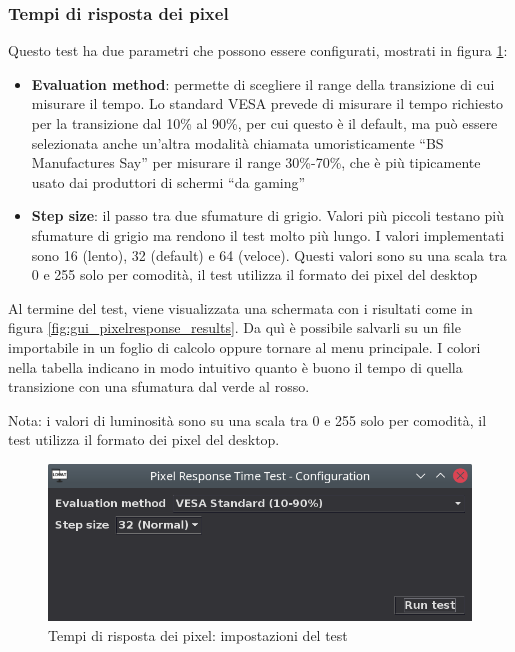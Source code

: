 \subsubsection{Tempi di risposta dei pixel}
Questo test ha due parametri che possono essere configurati, mostrati in figura \ref{fig:gui_pixelresponse_settings}:\begin{itemize}
	\item \textbf{Evaluation method}: permette di scegliere il range della transizione di cui misurare il tempo. Lo standard VESA prevede di misurare il tempo richiesto per la transizione dal 10\% al 90\%, per cui questo è il default, ma può essere selezionata anche un'altra modalità chiamata umoristicamente ``BS Manufactures Say'' per misurare il range 30\%-70\%, che è più tipicamente usato dai produttori di schermi ``da gaming''
	\item \textbf{Step size}: il passo tra due sfumature di grigio. Valori più piccoli testano più sfumature di grigio ma rendono il test molto più lungo. I valori implementati sono 16 (lento), 32 (default) e 64 (veloce). Questi valori sono su una scala tra 0 e 255 solo per comodità, il test utilizza il formato dei pixel del desktop
\end{itemize}

Al termine del test, viene visualizzata una schermata con i risultati come in figura \ref{fig:gui_pixelresponse_results}. Da quì è possibile salvarli su un file importabile in un foglio di calcolo oppure tornare al menu principale. I colori nella tabella indicano in modo intuitivo quanto è buono il tempo di quella transizione con una sfumatura dal verde al rosso.

Nota: i valori di luminosità sono su una scala tra 0 e 255 solo per comodità, il test utilizza il formato dei pixel del desktop.

\begin{figure}[H]
	\centering
	\includegraphics[width=.8\textwidth]{Applicazione_files/gui_pixelresponse_settings.png}
	\caption{Tempi di risposta dei pixel: impostazioni del test}
	\label{fig:gui_pixelresponse_settings}
\end{figure}

